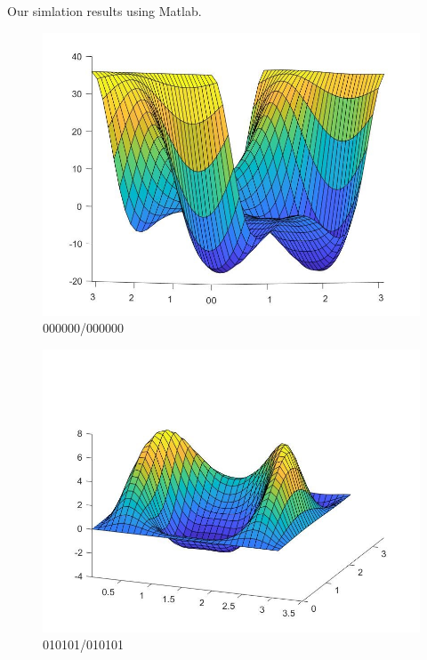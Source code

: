 \documentclass[]{article}
\begin{document}
	\par Our simlation results using Matlab.
	\begin{figure}[H]
		\centering
		\includegraphics[scale=0.3]{Fig/5.jpg}
		\caption{000000/000000}
	\end{figure}

	\begin{figure}[H]
		\centering
		\includegraphics[scale=0.3]{Fig/6.jpg}
		\caption{010101/010101}
	\end{figure}
	
\end{document}
